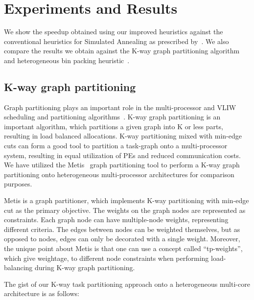 \section{Experiments and Results}

We show the speedup obtained using our improved heuristics against the
conventional heuristics for Simulated Annealing as prescribed
by~\cite{hors06}. We also compare the results we obtain against the
K-way graph partitioning algorithm~\cite{gkar95} and heterogeneous bin
packing heuristic~\cite{mmar11}.

\subsection{K-way graph partitioning}
\label{sec:k-way-graph}

Graph partitioning plays an important role in the multi-processor and
VLIW scheduling and partitioning
algorithms~\cite{aale01,kpur99,enys98}. K-way graph partitioning is an
important algorithm, which partitions a given graph into K or less
parts, resulting in load balanced allocations. K-way partitioning mixed
with min-edge cuts can form a good tool to partition a task-graph onto a
multi-processor system, resulting in equal utilization of PEs and
reduced communication costs. We have utilized the Metis~\cite{gkar95}
graph partitioning tool to perform a K-way graph partitioning onto
heterogeneous multi-processor architectures for comparison
purposes.

Metis is a graph partitioner, which implements K-way partitioning with
min-edge cut as the primary objective. The weights on the graph nodes
are represented as constraints. Each graph node can have multiple-node
weights, representing different criteria. The edges between nodes can be
weighted themselves, but as opposed to nodes, edges can only be
decorated with a single weight. Moreover, the unique point about Metis
is that one can use a concept called ``tp-weights'', which give
weightage, to different node constraints when performing load-balancing
during K-way graph partitioning. %

The gist of our K-way task partitioning approach onto a heterogeneous
multi-core architecture is as follows:

